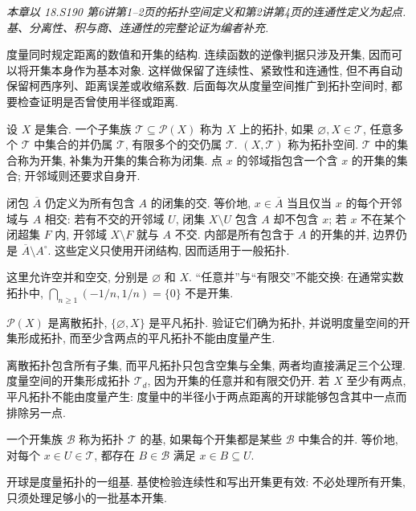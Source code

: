 \label{ch:topology}
\emph{本章以 18.S190 第6讲第1--2页的拓扑空间定义和第2讲第4页的连通性定义为起点. 基、分离性、积与商、连通性的完整论证为编者补充.}

度量同时规定距离的数值和开集的结构. 连续函数的逆像判据只涉及开集, 因而可以将开集本身作为基本对象. 这样做保留了连续性、紧致性和连通性, 但不再自动保留柯西序列、距离误差或收缩系数. 后面每次从度量空间推广到拓扑空间时, 都要检查证明是否曾使用半径或距离.

\begin{definition}
设 $X$ 是集合. 一个子集族 $\mathcal T\subseteq\mathcal P(X)$ 称为 $X$ 上的拓扑, 如果 $\varnothing,X\in\mathcal T$, 任意多个 $\mathcal T$ 中集合的并仍属 $\mathcal T$, 有限多个的交仍属 $\mathcal T$. $(X,\mathcal T)$ 称为拓扑空间. $\mathcal T$ 中的集合称为开集, 补集为开集的集合称为闭集. 点 $x$ 的邻域指包含一个含 $x$ 的开集的集合; 开邻域则还要求自身开.
\end{definition}
闭包 $\overline A$ 仍定义为所有包含 $A$ 的闭集的交. 等价地, $x\in\overline A$ 当且仅当 $x$ 的每个开邻域与 $A$ 相交: 若有不交的开邻域 $U$, 闭集 $X\setminus U$ 包含 $A$ 却不包含 $x$; 若 $x$ 不在某个闭超集 $F$ 内, 开邻域 $X\setminus F$ 就与 $A$ 不交. 内部是所有包含于 $A$ 的开集的并, 边界仍是 $\overline A\setminus A^\circ$. 这些定义只使用开闭结构, 因而适用于一般拓扑.

这里允许空并和空交, 分别是 $\varnothing$ 和 $X$. “任意并”与“有限交”不能交换: 在通常实数拓扑中, $\bigcap_{n\ge1}(-1/n,1/n)=\{0\}$ 不是开集.

\begin{example}
$\mathcal P(X)$ 是离散拓扑, $\{\varnothing,X\}$ 是平凡拓扑. 验证它们确为拓扑, 并说明度量空间的开集形成拓扑, 而至少含两点的平凡拓扑不能由度量产生.
\end{example}
\begin{solution}
离散拓扑包含所有子集, 而平凡拓扑只包含空集与全集, 两者均直接满足三个公理. 度量空间的开集形成拓扑 $\mathcal T_d$, 因为开集的任意并和有限交仍开. 若 $X$ 至少有两点, 平凡拓扑不能由度量产生: 度量中的半径小于两点距离的开球能够包含其中一点而排除另一点.
\end{solution}

\begin{definition}
一个开集族 $\mathcal B$ 称为拓扑 $\mathcal T$ 的基, 如果每个开集都是某些 $\mathcal B$ 中集合的并. 等价地, 对每个 $x\in U\in\mathcal T$, 都存在 $B\in\mathcal B$ 满足 $x\in B\subseteq U$.
\end{definition}
开球是度量拓扑的一组基. 基使检验连续性和写出开集更有效: 不必处理所有开集, 只须处理足够小的一批基本开集.

